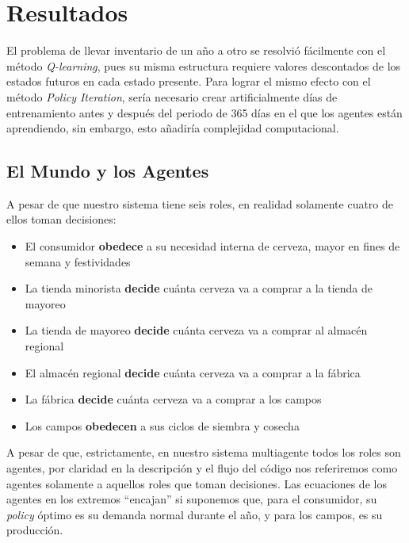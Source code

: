 \chapter{Resultados}

El problema de llevar inventario de un a\~no a otro se resolvi\'o f\'acilmente con el m\'etodo \textit{Q-learning}, pues su misma estructura requiere valores descontados de los estados futuros en cada estado presente. Para lograr el mismo efecto con el m\'etodo \textit{Policy Iteration}, ser\'ia necesario crear artificialmente d\'ias de entrenamiento antes y despu\'es del periodo de 365 d\'ias en el que los agentes est\'an aprendiendo, sin embargo, esto a\~nadir\'ia complejidad computacional.

\section{El Mundo y los Agentes}

A pesar de que nuestro sistema tiene seis roles, en realidad solamente cuatro de ellos toman decisiones:

\begin{itemize}
    \item El consumidor \textbf{obedece} a su necesidad interna de cerveza, mayor en fines de semana y festividades
    \item La tienda minorista \textbf{decide} cu\'anta cerveza va a comprar a la tienda de mayoreo
    \item La tienda de mayoreo \textbf{decide} cu\'anta cerveza va a comprar al almac\'en regional
    \item El almac\'en regional \textbf{decide} cu\'anta cerveza va a comprar a la f\'abrica
    \item La f\'abrica \textbf{decide} cu\'anta cerveza va a comprar a los campos
    \item Los campos \textbf{obedecen} a sus ciclos de siembra y cosecha
\end{itemize}

A pesar de que, estrictamente, en nuestro sistema multiagente todos los roles son agentes, por claridad en la descripci\'on y el flujo del c\'odigo nos referiremos como agentes solamente a aquellos roles que toman decisiones. Las ecuaciones de los agentes en los extremos ``encajan'' si suponemos que, para el consumidor, su \textit{policy} \'optimo es su demanda normal durante el a\~no, y para los campos, es su producci\'on.\\

